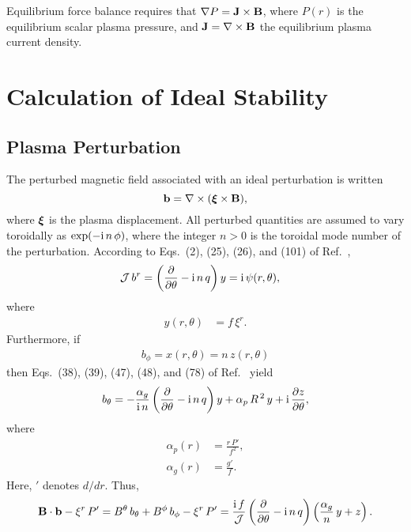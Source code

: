 \documentclass[12pt,prb,aps]{revtex4-1}
\newcommand {\bxi}{\mbox{\boldmath$\xi$}}
\begin{document}
Equilibrium force balance requires that
$ \nabla P={\bf J}\times {\bf B}$, 
where $P(r)$ is the equilibrium scalar plasma pressure, and ${\bf J}=\nabla\times {\bf B}$ the equilibrium plasma current density. 

\section{Calculation of Ideal Stability}

\subsection{Plasma Perturbation}
The perturbed magnetic field associated with an ideal perturbation is written\,\cite{freidberg,ideal}
\begin{equation}
{\bf b} = \nabla\times (\bxi\times{\bf B}),
\end{equation}
where $\bxi$ is the plasma displacement. All perturbed quantities are assumed to vary toroidally as $\exp(-{\rm i}\,n\,\phi)$,
where the integer  $n>0$ is the toroidal mode number of the perturbation.  According to Eqs.~(2), (25), (26), and
(101) of Ref.~, 
\begin{align}\label{e9}
{\cal J}\,b^r&=\left(\frac{\partial}{\partial\theta}-{\rm i}\,n\,q\right)y = {\rm i}\,\psi(r,\theta),
\end{align}
where
\begin{align}\label{e10}
y(r,\theta)&= f\,\xi^r.
\end{align}
Furthermore, if
\begin{align}
b_\phi = x(r,\theta)= n\,z(r,\theta)
\end{align}
then Eqs.~(38), (39), (47), (48), and (78) of Ref.~ yield
\begin{align}
b_\theta = -\frac{\alpha_g}{{\rm i}\,n}\left(\frac{\partial}{\partial\theta} - {\rm i}\,n\,q\right)y +\alpha_p\,R^{\,2}\,y +{\rm i}\,\frac{\partial z}{\partial\theta},
\end{align}
where
\begin{align}
\alpha_p(r) &= \frac{r\,P'}{f^2},\label{ap}\\[0.5ex]
\alpha_g (r)&= \frac{g'}{f}.\label{ag}
\end{align}
Here, $'$ denotes $d/dr$. 
Thus,
\begin{equation}\label{e15}
{\bf B}\cdot{\bf b} -\xi^r\,P' = B^\theta\,b_\theta+B^\phi\,b_\phi - \xi^r\,P'=
\frac{{\rm i}\,f}{\cal J}\left(\frac{\partial}{\partial\theta}- {\rm i}\,n\,q\right)\left(\frac{\alpha_g}{n}\,y+z\right).
\end{equation}
\end{document}
